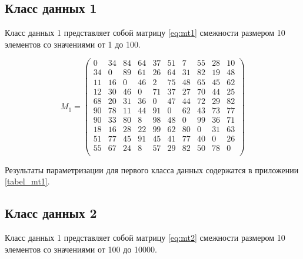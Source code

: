 \subsection{Класс данных 1}\label{par:class1}

Класс данных 1 представляет собой матрицу \eqref{eq:mt1} смежности размером 10 элементов со значениями от 1 до 100.

\begin{equation}
	\label{eq:mt1}
	M_1 = 
	\begin{pmatrix}
		0 & 34 & 84 & 64 & 37 & 51 & 7 & 55 & 28 & 10 \\
		34 & 0 & 89 & 61 & 26 & 64 & 31 & 82 & 19 & 48 \\
		11 & 16 & 0 & 46 & 2 & 75 & 48 & 65 & 45 & 62 \\
		12 & 30 & 46 & 0 & 71 & 37 & 27 & 70 & 44 & 25 \\
		68 & 20 & 31 & 36 & 0 & 47 & 44 & 72 & 29 & 82 \\
		90 & 78 & 11 & 44 & 91 & 0 & 62 & 43 & 73 & 77 \\
		90 & 33 & 80 & 8 & 98 & 48 & 0 & 99 & 36 & 71 \\
		18 & 16 & 28 & 22 & 99 & 62 & 80 & 0 & 31 & 63 \\
		51 & 77 & 45 & 91 & 45 & 41 & 77 & 40 & 0 & 26 \\
		55 & 67 & 24 & 8 & 57 & 29 & 82 & 50 & 78 & 0 \\
	\end{pmatrix}
\end{equation}

Результаты параметризации для первого класса данных содержатся в приложении \ref{tabel_mt1}.

\subsection{Класс данных 2}\label{par:class2}

Класс данных 1 представляет собой матрицу \eqref{eq:mt2} смежности размером 10 элементов со значениями от 100 до 10000.


